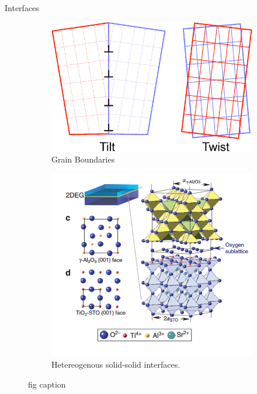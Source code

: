 \documentclass[aspectratio=169]{beamer}
\begin{document}
    \begin{frame}{Interfaces}
        \begin{figure}
            \centering
            \begin{subfigure}{0.45\textwidth}
                \centering
                \includegraphics[width=\linewidth]{lectures/figures/11_GBs.png}
                \caption{Grain Boundaries}
            \end{subfigure}
            \begin{subfigure}{0.45\textwidth}
                \centering
                \includegraphics[width=\linewidth]{lectures/figures/11_hetero_interfaces.png}
                \caption{Hetereogenous solid-solid interfaces.}
            \end{subfigure}
            \caption{fig caption}
            \label{fig}
        \end{figure}
    \end{frame}
\end{document}

